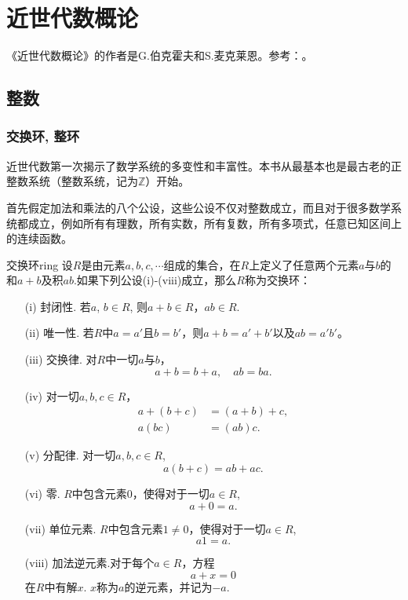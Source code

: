 \part{近世代数概论}
《近世代数概论》的作者是G.伯克霍夫和S.麦克莱恩。参考：\cite{surveyofmodernalgebra1979}。

\chapter{整数}\label{section001}

\section{交换环, 整环}\label{subsection0010101}
近世代数第一次揭示了数学系统的多变性和丰富性。本书从最基本也是最古老的正整数系统（整数系统，记为$\mathbb{Z}$）开始。

首先假定加法和乘法的八个公设，这些公设不仅对整数成立，而且对于很多数学系统都成立，例如所有有理数，所有实数，所有复数，所有多项式，任意已知区间上的连续函数。

\begin{definition}{交换环}{ring} 
设$R$是由元素$a,b,c,\cdots$组成的集合，在$R$上定义了任意两个元素$a$与$b$的和$a+b$及积$ab$.如果下列公设(i)-(viii)成立，那么$R$称为交换环：
\begin{enumerate}
\item[(i)] 封闭性. 若$a$, $b \in R$, 则$a+b \in R$，$ab \in R$.
\item[(ii)] 唯一性. 若$R$中$a=a'$且$b=b'$，则$a+b=a'+b'$以及$ab=a'b'$。
\item[(iii)]交换律. 对$R$中一切$a$与$b$，
\[
a+b=b+a,\quad ab=ba.
\]
\item[(iv)]对一切$a,b,c \in R$，
\[
\begin{aligned}
a + (b + c) &= (a+b)+c, \\
a(bc) &= (ab)c.
\end{aligned}
\]
\item[(v)]分配律. 对一切$a,b,c \in R$,
\[
a(b + c)=ab + ac. 
\]
\item[(vi)]零. $R$中包含元素$0$，使得对于一切$a \in R$, 
\[
a + 0 = a.
\]
\item[(vii)]单位元素. $R$中包含元素$1 \neq 0$，使得对于一切$a \in R$,
\[
a1=a.
\]
\item[(viii)]加法逆元素.对于每个$a \in R$，方程
\[
a + x = 0
\]
在$R$中有解$x$. $x$称为$a$的逆元素，并记为$-a$.
\end{enumerate}
\end{definition}

